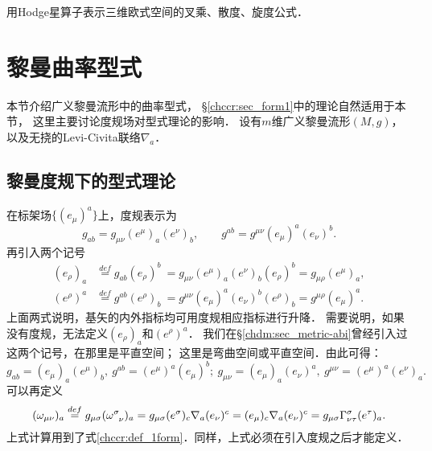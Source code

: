 \begin{exercise}
	用Hodge星算子表示三维欧式空间的叉乘、散度、旋度公式．
\end{exercise}




\section{黎曼曲率型式}\label{chrg:sec_form2}
本节介绍广义黎曼流形中的曲率型式\cite[\S 1.7]{chandrasekhar-1983}，
\S\ref{chccr:sec_form1}中的理论自然适用于本节，
这里主要讨论度规场对型式理论的影响．
设有$m$维广义黎曼流形$(M,g)$，以及无挠的Levi-Civita联络$\nabla_a$．


\subsection{黎曼度规下的型式理论}
在标架场$\{(e_\mu)^a\}$上，度规表示为
\begin{equation}
g_{ab}=g_{\mu\nu}(e^\mu)_a (e^\nu)_b, \qquad
g^{ab}=g^{\mu\nu}(e_\mu)^a (e_\nu)^b.
\end{equation}
再引入两个记号
\begin{align}
(e_\rho)_a &\overset{def}{=} g_{ab}(e_\rho)^b \
= g_{\mu\nu}(e^\mu)_a (e^\nu)_b (e_\rho)^b
= g_{\mu\rho}(e^\mu)_a, \\
(e^\rho)^a &\overset{def}{=} g^{ab}(e^\rho)_b \
= g^{\mu\nu}(e_\mu)^a (e_\nu)^b(e^\rho)_b
= g^{\mu\rho}(e_\mu)^a .
\end{align}
上面两式说明，基矢的内外指标均可用度规相应指标进行升降．
需要说明，如果没有度规，无法定义$(e_\rho)_a$和$(e^\rho)^a$．
我们在\S\ref{chdm:sec_metric-abi}曾经引入过这两个记号，在那里是平直空间；
这里是弯曲空间或平直空间．由此可得：
\begin{equation}
  g_{ab}=(e_\mu)_a (e^\mu)_b, \  g^{ab}=(e^\mu)^a (e_\mu)^b ; \
  g_{\mu\nu}=(e_\mu)_a (e_\nu)^a, \  g^{\mu\nu}=(e^\mu)^a (e^\nu)_a .
\end{equation}
可以再定义
\begin{equation}
    (\omega _{\mu\nu})_{a} \overset{def}{=}
      g_{\mu\sigma} (\omega ^{\sigma}_{\hphantom{\sigma}\nu})_{a}
    = g_{\mu\sigma} (e^\sigma)_c \nabla _a (e_\nu)^c
    = (e_\mu)_c \nabla _a (e_\nu)^c
    = g_{\mu\sigma}\Gamma^{\sigma}_{\nu\tau} (e^\tau)_a .
\end{equation}
上式计算用到了式\eqref{chccr:def_1form}．同样，上式必须在引入度规之后才能定义．

